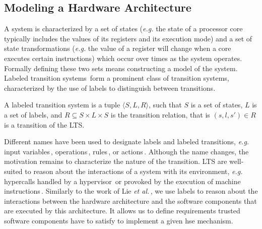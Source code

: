 \subsection{Modeling a Hardware Architecture}
\label{subsec:sota:ltsdef}

A system is characterized by a set of states (\emph{e.g.} the state of a
processor core typically includes the values of its registers and its execution
mode) and a set of state transformations (\emph{e.g.}  the value of a register
will change when a core executes certain instructions) which occur over times as
the system operates.
%
Formally defining these two sets means constructing a model of the system.
%
%
Labeled transition systems\,\cite{loiseaux1995lts} form a prominent class of
transition systems, characterized by the use of labels to distinguish between
transitions.

\begin{definition}
  \label{def:sota:lts}
  A labeled transition system is a tuple \( \langle S, L, R \rangle \), such
  that \( S \) is a set of states, \( L \) is a set of labels, and
  \( R \subseteq S \times L \times S \) is the transition relation, that is
  \( (s, l, s') \in R \) is a transition of the LTS.
\end{definition}

Different names have been used to designate labels and labeled transitions,
\emph{e.g.} input variables\,\cite{cimatti2002nusmv},
operations\,\cite{jackson2012alloy}, rules\,\cite{murphi}, or
actions\,\cite{barthe2011virtcert1}.
%
Although the name changes, the motivation remains to characterize the nature of
the transition.
%
LTS are well-suited to reason about the interactions of a system with its
environment, \emph{e.g.} hypercalls handled by a
hypervisor\,\cite{barthe2011virtcert1} or \IOs provoked by the execution of
machine instructions\,\cite{lie2003xom}.
%
Similarly to the work of Lie \textit{et al.}\,\cite{lie2003xom}, we use labels
to reason about the interactions between the hardware architecture and the
software components that are executed by this architecture.
%
It allows us to define requirements trusted software components have to satisfy
to implement a given \ac{hse} mechanism.

